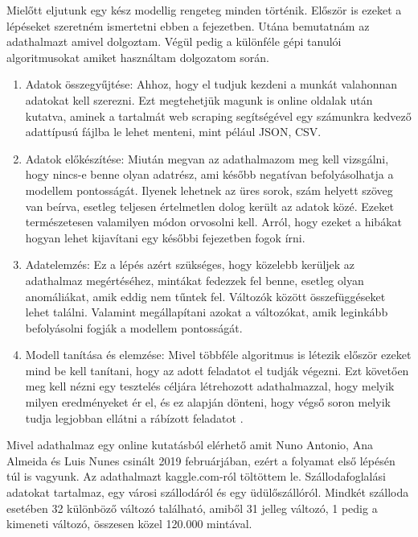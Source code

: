 
Mielőtt eljutunk egy kész modellig rengeteg minden történik. Először is ezeket a lépéseket szeretném ismertetni ebben a fejezetben. Utána bemutatnám az adathalmazt amivel dolgoztam. Végül pedig a különféle gépi tanulói algoritmusokat amiket használtam dolgozatom során.

\begin{enumerate}
    \item Adatok összegyűjtése: Ahhoz, hogy el tudjuk kezdeni a munkát valahonnan adatokat kell szerezni. Ezt megtehetjük magunk is online oldalak után kutatva, aminek a tartalmát web scraping segítségével egy számunkra kedvező adattípusú fájlba le lehet menteni, mint pélául JSON, CSV.
    \item Adatok előkészítése: Miután megvan az adathalmazom meg kell vizsgálni, hogy nincs-e benne olyan adatrész, ami később negatívan befolyásolhatja a modellem pontosságát. Ilyenek lehetnek az üres sorok, szám helyett szöveg van beírva, esetleg teljesen értelmetlen dolog került az adatok közé. Ezeket természetesen valamilyen módon orvosolni kell. Arról, hogy ezeket a hibákat hogyan lehet kijavítani egy későbbi fejezetben fogok írni.
    \item Adatelemzés: Ez a lépés azért szükséges, hogy közelebb kerüljek az adathalmaz megértéséhez, mintákat fedezzek fel benne, esetleg olyan anomáliákat, amik eddig nem tűntek fel. Változók között összefüggéseket lehet találni. Valamint megállapítani azokat a változókat, amik leginkább befolyásolni fogják a modellem pontosságát.
    \item Modell tanítása és elemzése: Mivel többféle algoritmus is létezik először ezeket mind be kell tanítani, hogy az adott feladatot el tudják végezni. Ezt követően meg kell nézni egy tesztelés céljára létrehozott adathalmazzal, hogy melyik milyen eredményeket ér el, és ez alapján dönteni, hogy végső soron melyik tudja legjobban ellátni a rábízott feladatot \cite{machinelearningbasics}. 
\end{enumerate}

Mivel adathalmaz egy online kutatásból elérhető amit Nuno Antonio, Ana Almeida és Luis Nunes csinált 2019 februárjában, ezért a folyamat első lépésén túl is vagyunk. Az adathalmazt kaggle.com-ról töltöttem le. Szállodafoglalási adatokat tartalmaz, egy városi szállodáról és egy üdülőszállóról. Mindkét szálloda esetében 32 különböző változó található, amiből 31 jelleg változó, 1 pedig a kimeneti változó, összesen közel 120.000 mintával.\cite{adathalmaz}

